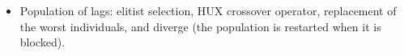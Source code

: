\documentclass[a4paper,twoside]{article}
\begin{document}
\begin{itemize}
  \item{Population of lags:} elitist selection, HUX crossover operator, replacement of the worst individuals, and diverge (the population is restarted when it is blocked).
%
%
%
%
\end{itemize}

\end{document}
